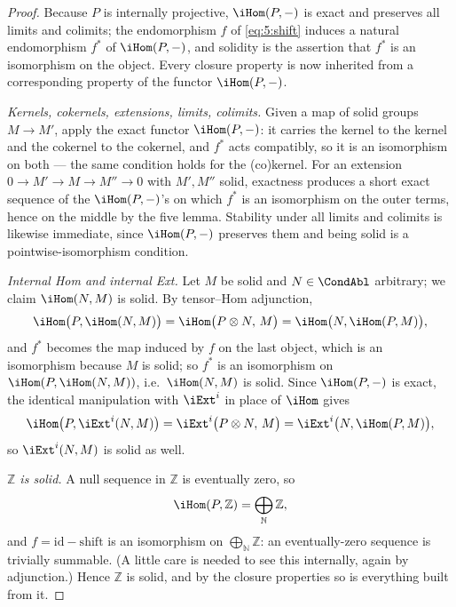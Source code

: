 \begin{proof}
Because $P$ is internally projective, $\iHom(P,-)$ is exact and preserves all
limits and colimits; the endomorphism $f$ of \eqref{eq:5:shift} induces a natural
endomorphism $f^\ast$ of $\iHom(P,-)$, and solidity is the assertion that $f^\ast$
is an isomorphism on the object. Every closure property is now inherited from a
corresponding property of the functor $\iHom(P,-)$.

\emph{Kernels, cokernels, extensions, limits, colimits.} Given a map of solid
groups $M\to M'$, apply the exact functor $\iHom(P,-)$: it carries the kernel to
the kernel and the cokernel to the cokernel, and $f^\ast$ acts compatibly, so it
is an isomorphism on both --- the same condition holds for the (co)kernel. For an
extension $0\to M'\to M\to M''\to 0$ with $M',M''$ solid, exactness produces a
short exact sequence of the $\iHom(P,-)$'s on which $f^\ast$ is an isomorphism on
the outer terms, hence on the middle by the five lemma. Stability under all limits
and colimits is likewise immediate, since $\iHom(P,-)$ preserves them and being
solid is a pointwise-isomorphism condition.

\emph{Internal Hom and internal Ext.} Let $M$ be solid and $N\in\CondAbl$
arbitrary; we claim $\iHom(N,M)$ is solid. By tensor--Hom adjunction,
\begin{equation*}
\iHom\bigl(P,\iHom(N,M)\bigr)
=\iHom\bigl(P\otimes N,\,M\bigr)
=\iHom\bigl(N,\iHom(P,M)\bigr),
\end{equation*}
and $f^\ast$ becomes the map induced by $f$ on the last object, which is an
isomorphism because $M$ is solid; so $f^\ast$ is an isomorphism on
$\iHom(P,\iHom(N,M))$, i.e.\ $\iHom(N,M)$ is solid. Since $\iHom(P,-)$ is exact,
the identical manipulation with $\iExt^i$ in place of $\iHom$ gives
\begin{equation*}
\iHom\bigl(P,\iExt^{i}(N,M)\bigr)=\iExt^{i}\bigl(P\otimes N,\,M\bigr)
=\iExt^{i}\bigl(N,\iHom(P,M)\bigr),
\end{equation*}
so $\iExt^{i}(N,M)$ is solid as well.

\emph{$\mathbb{Z}$ is solid.} A null sequence in $\mathbb{Z}$ is eventually zero,
so
\begin{equation}
\label{eq:5:hom-P-Z}
\iHom(P,\mathbb{Z})=\bigoplus_{\mathbb{N}}\mathbb{Z},
\end{equation}
and $f=\mathrm{id}-\mathrm{shift}$ is an isomorphism on $\bigoplus_{\mathbb{N}}
\mathbb{Z}$: an eventually-zero sequence is trivially summable. (A little care is
needed to see this internally, again by adjunction.) Hence $\mathbb{Z}$ is solid,
and by the closure properties so is everything built from it.
\end{proof}

